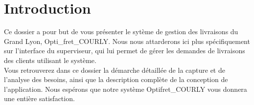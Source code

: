 \chapter*{Introduction}
Ce dossier a pour but de vous présenter le sytème de gestion des livraisons du Grand Lyon, Opti_fret_COURLY. Nous nous attarderons ici plus spécifiquement sur l'interface du superviseur, qui lui permet de gérer les demandes de livraisons des clients utilisant le système.\\
Vous retrouverez dans ce dossier la démarche détaillée de la capture et de l'analyse des besoins, ainsi que la description complète de la conception de l'application. Nous espérons que notre système Optifret_COURLY vous donnera une entière satisfaction.
